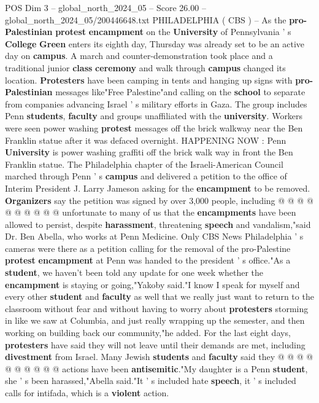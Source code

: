 \begin{textsample}{POS Dim 3 – global\_north\_2024\_05 – Score 26.00 – global\_north\_2024\_05/200446648.txt}  \label{ex:f3_pos_012}
PHILADELPHIA ( CBS ) -- As the \textbf{pro-Palestinian} \textbf{protest} \textbf{encampment} on the \textbf{University} of Pennsylvania ' s \textbf{College} \textbf{Green} enters its eighth day, Thursday was already set to be an active day on \textbf{campus}.
A march and counter-demonstration took place and a traditional junior \textbf{class} \textbf{ceremony} and walk through \textbf{campus} changed its location. \textbf{Protesters} have been camping in tents and hanging up signs with \textbf{pro-Palestinian} messages like"Free Palestine"and calling on the \textbf{school} to separate from companies advancing Israel ' s military efforts in Gaza.
The group includes Penn \textbf{students}, \textbf{faculty} and groups unaffiliated with the \textbf{university}.
Workers were seen power washing \textbf{protest} messages off the brick walkway near the Ben Franklin statue after it was defaced overnight.
HAPPENING NOW : Penn \textbf{University} is power washing graffiti off the brick walk way in front the Ben Franklin statue.
The Philadelphia chapter of the Israeli-American Council marched through Penn ' s \textbf{campus} and delivered a petition to the office of Interim President J.
Larry Jameson asking for the \textbf{encampment} to be removed. \textbf{Organizers} say the petition was signed by over 3,000 people, including @ @ @ @ @ @ @ @ @ @ unfortunate to many of us that the \textbf{encampments} have been allowed to persist, despite \textbf{harassment}, threatening \textbf{speech} and vandalism,"said Dr.
Ben Abella, who works at Penn Medicine.
Only CBS News Philadelphia ' s cameras were there as a petition calling for the removal of the pro-Palestine \textbf{protest} \textbf{encampment} at Penn was handed to the president ' s office."As a \textbf{student}, we haven't been told any update for one week whether the \textbf{encampment} is staying or going,"Yakoby said."I know I speak for myself and every other \textbf{student} and \textbf{faculty} as well that we really just want to return to the classroom without fear and without having to worry about \textbf{protesters} storming in like we saw at Columbia, and just really wrapping up the semester, and then working on building back our community,"he added.
For the last eight days, \textbf{protesters} have said they will not leave until their demands are met, including \textbf{divestment} from Israel.
Many Jewish \textbf{students} and \textbf{faculty} said they @ @ @ @ @ @ @ @ @ @ actions have been \textbf{antisemitic}."My daughter is a Penn \textbf{student}, she ' s been harassed,"Abella said."It ' s included hate \textbf{speech}, it ' s included calls for intifada, which is a \textbf{violent} action.

\end{textsample}
